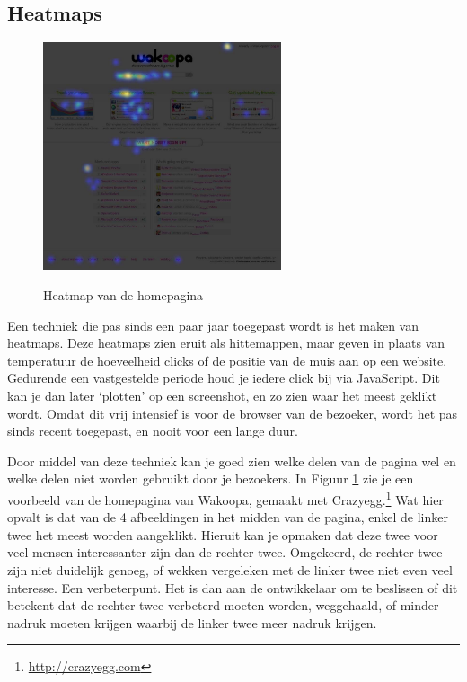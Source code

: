\documentclass[a4paper, 10pt, pdftex]{report}
\begin{document}
    \subsection{Heatmaps}
      \begin{figure}
      \begin{center}
      \caption{Heatmap van de homepagina}
        \includegraphics[width=70mm]{../images/heatmap}
      \label{heatmap}
      \end{center}
    \end{figure}
    Een techniek die pas sinds een paar jaar toegepast wordt is het maken van heatmaps. Deze heatmaps zien eruit als hittemappen, maar geven in plaats van temperatuur de hoeveelheid clicks of de positie van de muis aan op een website. Gedurende een vastgestelde periode houd je iedere click bij via JavaScript. Dit kan je dan later `plotten' op een screenshot, en zo zien waar het meest geklikt wordt. Omdat dit vrij intensief is voor de browser van de bezoeker, wordt het pas sinds recent toegepast, en nooit voor een lange duur.

    Door middel van deze techniek kan je goed zien welke delen van de pagina wel en welke delen niet worden gebruikt door je bezoekers. In Figuur \ref{heatmap} zie je een voorbeeld van de homepagina van Wakoopa, gemaakt met Crazyegg.\footnote{\url{http://crazyegg.com}} Wat hier opvalt is dat van de 4 afbeeldingen in het midden van de pagina, enkel de linker twee het meest worden aangeklikt. Hieruit kan je opmaken dat deze twee voor veel mensen interessanter zijn dan de rechter twee. Omgekeerd, de rechter twee zijn niet duidelijk genoeg, of wekken vergeleken met de linker twee niet even veel interesse. Een verbeterpunt. Het is dan aan de ontwikkelaar om te beslissen of dit betekent dat de rechter twee verbeterd moeten worden, weggehaald, of minder nadruk moeten krijgen waarbij de linker twee meer nadruk krijgen.
\end{document}
